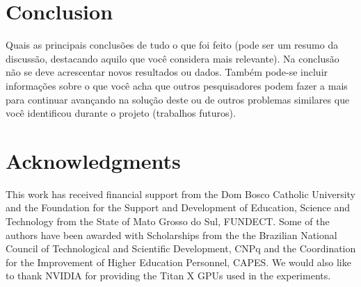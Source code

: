 \documentclass[preprint,10pt,5p]{elsarticle}
\begin{document}

\section{Conclusion}

Quais as principais conclusões de tudo o que foi feito (pode ser um resumo da discussão, destacando aquilo que você considera mais relevante). Na conclusão não se deve acrescentar novos resultados ou dados. Também pode-se incluir informações sobre o que você acha que outros pesquisadores podem fazer a mais para continuar avançando na solução deste ou de outros problemas similares que você identificou durante o projeto (trabalhos futuros).




\section{Acknowledgments}
This work has received financial support from the Dom Bosco Catholic University and the Foundation for the Support and Development of Education, Science and Technology from the State of Mato Grosso do Sul, FUNDECT. Some of the authors have been awarded with Scholarships from the the Brazilian National Council of Technological and Scientific Development, CNPq and the Coordination for the Improvement of Higher Education Personnel, CAPES. We would also like to thank NVIDIA for providing the Titan X GPUs used in the experiments.






% 




\end{document}
